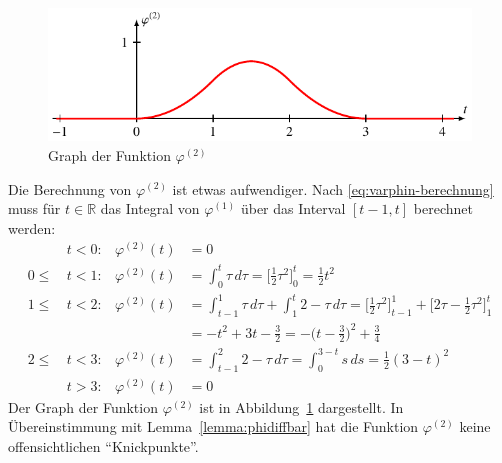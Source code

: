 \begin{beispiel}
\begin{figure}
\centering
\includegraphics{chapters/9-spline/images/phi2.pdf}
\caption{Graph der Funktion $\varphi^{(2)}$
\label{spline:phi2}}
\end{figure}
Die Berechnung von $\varphi^{(2)}$ ist etwas aufwendiger.
Nach \eqref{eq:varphin-berechnung} muss
für $t\in\mathbb R$ das Integral von $\varphi^{(1)}$ über
das Interval $[t-1,t]$ berechnet werden:
\begin{align*}
&t<0:
&
\varphi^{(2)}(t)
&=0
\\
0\le\,&t<1:
&
\varphi^{(2)}(t)
&=
\int_0^t\tau\,d\tau
=
\biggl[\frac12\tau^2\biggr]_0^t = \frac12t^2
\\
1\le\,&t<2:
&
\varphi^{(2)}(t)
&=
\int_{t-1}^1 \tau\,d\tau
+
\int_1^t 2-\tau\,d\tau
=
\biggl[\frac12\tau^2\biggr]_{t-1}^1
+
\biggl[2\tau-\frac12\tau^2\biggr]_1^t
\\
&&
&=
-t^2+3t-\frac32
=
-\biggl(t-\frac32\biggr)^2+\frac34
\\
2\le\,&t<3:
&
\varphi^{(2)}(t)
&=
\int_{t-1}^2 2-\tau\,d\tau
=
\int_0^{3-t} s\,ds
=
\frac12(3-t)^2
\\
&t>3:
&
\varphi^{(2)}(t)
&=
0
\end{align*}
Der Graph der Funktion $\varphi^{(2)}$ ist in Abbildung~\ref{spline:phi2}
dargestellt.
In Übereinstimmung mit Lemma~\ref{lemma:phidiffbar} hat die Funktion
$\varphi^{(2)}$ keine offensichtlichen ``Knickpunkte''.
\end{beispiel}


